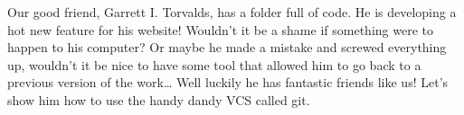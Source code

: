 \begin{blocksection}
\question
Our good friend, Garrett I. Torvalds, has a folder full of code. He is developing a hot new feature for his website! Wouldn’t it be a shame if something were to happen to his computer? Or maybe he made a mistake and screwed everything up, wouldn’t it be nice to have some tool that allowed him to go back to a previous version of the work… Well luckily he has fantastic friends like us! Let’s show him how to use the handy dandy VCS called git.


\end{blocksection}

\begin{solution}

\end{solution}
